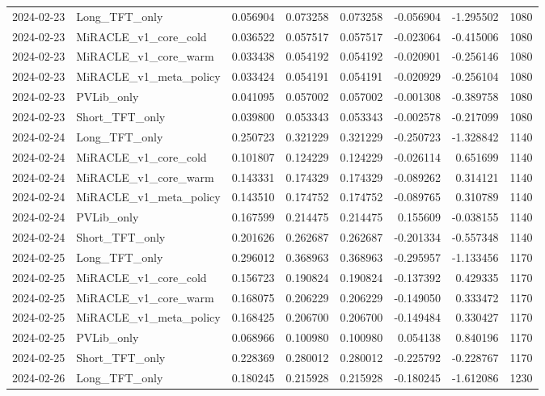 \begin{tabular}{llrrrrrr}
2024-02-23 & Long_TFT_only & 0.056904 & 0.073258 & 0.073258 & -0.056904 & -1.295502 & 1080 \\
2024-02-23 & MiRACLE_v1_core_cold & 0.036522 & 0.057517 & 0.057517 & -0.023064 & -0.415006 & 1080 \\
2024-02-23 & MiRACLE_v1_core_warm & 0.033438 & 0.054192 & 0.054192 & -0.020901 & -0.256146 & 1080 \\
2024-02-23 & MiRACLE_v1_meta_policy & 0.033424 & 0.054191 & 0.054191 & -0.020929 & -0.256104 & 1080 \\
2024-02-23 & PVLib_only & 0.041095 & 0.057002 & 0.057002 & -0.001308 & -0.389758 & 1080 \\
2024-02-23 & Short_TFT_only & 0.039800 & 0.053343 & 0.053343 & -0.002578 & -0.217099 & 1080 \\
2024-02-24 & Long_TFT_only & 0.250723 & 0.321229 & 0.321229 & -0.250723 & -1.328842 & 1140 \\
2024-02-24 & MiRACLE_v1_core_cold & 0.101807 & 0.124229 & 0.124229 & -0.026114 & 0.651699 & 1140 \\
2024-02-24 & MiRACLE_v1_core_warm & 0.143331 & 0.174329 & 0.174329 & -0.089262 & 0.314121 & 1140 \\
2024-02-24 & MiRACLE_v1_meta_policy & 0.143510 & 0.174752 & 0.174752 & -0.089765 & 0.310789 & 1140 \\
2024-02-24 & PVLib_only & 0.167599 & 0.214475 & 0.214475 & 0.155609 & -0.038155 & 1140 \\
2024-02-24 & Short_TFT_only & 0.201626 & 0.262687 & 0.262687 & -0.201334 & -0.557348 & 1140 \\
2024-02-25 & Long_TFT_only & 0.296012 & 0.368963 & 0.368963 & -0.295957 & -1.133456 & 1170 \\
2024-02-25 & MiRACLE_v1_core_cold & 0.156723 & 0.190824 & 0.190824 & -0.137392 & 0.429335 & 1170 \\
2024-02-25 & MiRACLE_v1_core_warm & 0.168075 & 0.206229 & 0.206229 & -0.149050 & 0.333472 & 1170 \\
2024-02-25 & MiRACLE_v1_meta_policy & 0.168425 & 0.206700 & 0.206700 & -0.149484 & 0.330427 & 1170 \\
2024-02-25 & PVLib_only & 0.068966 & 0.100980 & 0.100980 & 0.054138 & 0.840196 & 1170 \\
2024-02-25 & Short_TFT_only & 0.228369 & 0.280012 & 0.280012 & -0.225792 & -0.228767 & 1170 \\
2024-02-26 & Long_TFT_only & 0.180245 & 0.215928 & 0.215928 & -0.180245 & -1.612086 & 1230 \\

\end{tabular}
